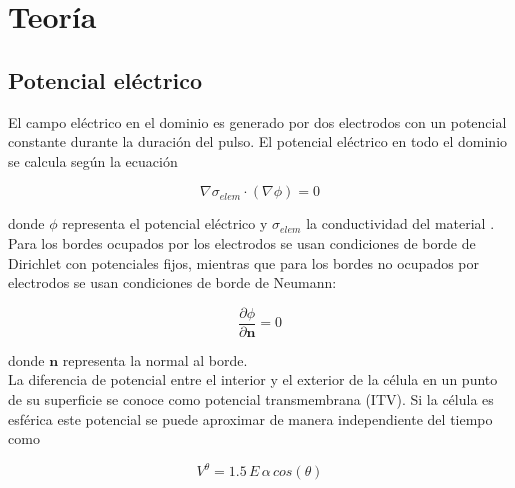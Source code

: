 \documentclass[a4paper,10pt]{article}
\begin{document}


\clearpage
\section{Teoría}

\subsection{Potencial eléctrico}

El campo eléctrico en el dominio es generado por dos electrodos con un potencial constante durante la duración del pulso. El potencial eléctrico en todo el dominio se calcula según la ecuación 

\begin{equation} \label{eq:poisson}
	\nabla \sigma_{elem} \cdot (\nabla \phi) = 0 
\end{equation}

donde $\phi$ representa el potencial eléctrico y $\sigma_{elem}$ la conductividad del material \cite[p.~88]{fem-electro}.\\

Para los bordes ocupados por los electrodos se usan condiciones de borde de Dirichlet con potenciales fijos, mientras que para los bordes no ocupados por electrodos se usan condiciones de borde de Neumann:

\begin{equation}
	\frac{\partial \phi}{\partial \mathbf{n}} = 0
\end{equation}

donde $\mathbf{n}$ representa la normal al borde.\\

La diferencia de potencial entre el interior y el exterior de la célula en un punto de su superficie se conoce como potencial transmembrana (ITV). Si la célula es esférica este potencial se puede aproximar de manera independiente del tiempo como

\begin{equation} \label{eq:cos}
	V^{\theta} = 1.5\, E\, \alpha\, cos (\theta)
\end{equation}
\end{document}
